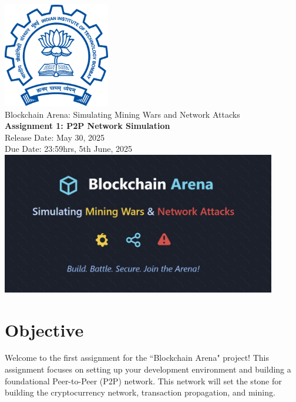 \documentclass[12pt]{extarticle}
\begin{document}
\begin{titlepage}
    \begin{center}
        \includegraphics[width=0.35\textwidth]{iitb_logo.png}\\[1.5cm]
        {\Large Blockchain Arena: Simulating Mining Wars and Network Attacks}\\
        \vspace{0.5cm}
        {\Large \bfseries Assignment 1: P2P Network Simulation}\\
        \vspace{1.5cm}
        {\Large Release Date: May 30, 2025}\\
        \vspace{1cm}
        {\Large Due Date: 23:59hrs, 5th June, 2025}\\
        \vspace{3cm}
        \includegraphics[width=0.9\textwidth]{blockchain_arena.jpeg}\\[1.5cm]
    \end{center}
\end{titlepage}

\section*{Objective}
Welcome to the first assignment for the ``Blockchain Arena" project! This assignment focuses on setting up your development environment and building a foundational Peer-to-Peer (P2P) network. This network will set the stone for building the cryptocurrency network, transaction propagation, and mining.
\end{document}
